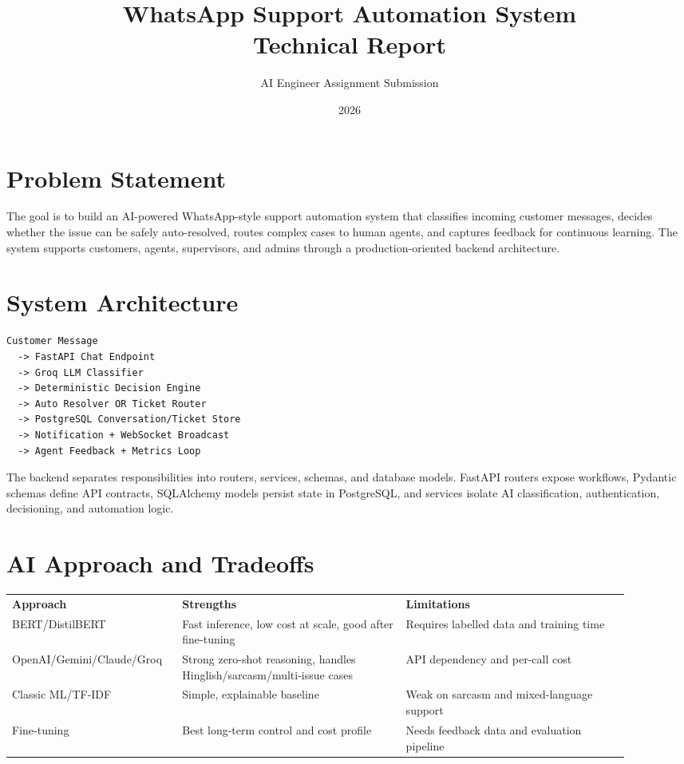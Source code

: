 ﻿\documentclass[11pt,a4paper]{article}
\title{\textbf{WhatsApp Support Automation System}\\\large Technical Report}
\author{AI Engineer Assignment Submission}
\date{2026}
\begin{document}
\maketitle

\section{Problem Statement}
The goal is to build an AI-powered WhatsApp-style support automation system that classifies incoming customer messages, decides whether the issue can be safely auto-resolved, routes complex cases to human agents, and captures feedback for continuous learning. The system supports customers, agents, supervisors, and admins through a production-oriented backend architecture.

\section{System Architecture}
\begin{verbatim}
Customer Message
  -> FastAPI Chat Endpoint
  -> Groq LLM Classifier
  -> Deterministic Decision Engine
  -> Auto Resolver OR Ticket Router
  -> PostgreSQL Conversation/Ticket Store
  -> Notification + WebSocket Broadcast
  -> Agent Feedback + Metrics Loop
\end{verbatim}

The backend separates responsibilities into routers, services, schemas, and database models. FastAPI routers expose workflows, Pydantic schemas define API contracts, SQLAlchemy models persist state in PostgreSQL, and services isolate AI classification, authentication, decisioning, and automation logic.

\section{AI Approach and Tradeoffs}
\begin{tabular}{>{\raggedright}p{0.22\linewidth} >{\raggedright}p{0.34\linewidth} >{\raggedright\arraybackslash}p{0.34\linewidth}}
\textbf{Approach} & \textbf{Strengths} & \textbf{Limitations} \\
BERT/DistilBERT & Fast inference, low cost at scale, good after fine-tuning & Requires labelled data and training time \\
OpenAI/Gemini/Claude/Groq & Strong zero-shot reasoning, handles Hinglish/sarcasm/multi-issue cases & API dependency and per-call cost \\
Classic ML/TF-IDF & Simple, explainable baseline & Weak on sarcasm and mixed-language support \\
Fine-tuning & Best long-term control and cost profile & Needs feedback data and evaluation pipeline \\
\end{tabular}
\end{document}
